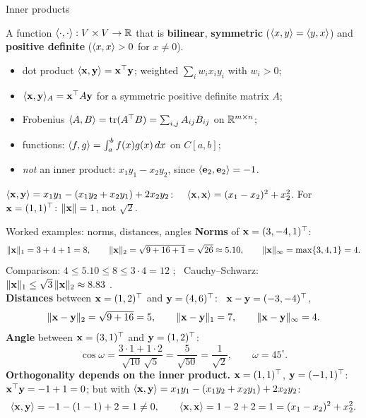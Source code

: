 \documentclass[aspectratio=1610,11pt]{beamer}
\begin{document}
\begin{frame}{Inner products}
    \begin{definition}
        A function $\langle \cdot, \cdot \rangle: V \times V \to \mathbb{R}$ that is
        \textbf{bilinear}, \textbf{symmetric} ($\langle x, y \rangle = \langle y, x \rangle$) and \textbf{positive definite} ($\langle x, x \rangle > 0$ for $x \neq 0$).
    \end{definition}
    \small
    \begin{itemize}
        \item dot product $\langle \mathbf{x}, \mathbf{y} \rangle = \mathbf{x}^\top\mathbf{y}$; \quad weighted $\sum_i w_i x_i y_i$ with $w_i > 0$;
        \item $\langle \mathbf{x}, \mathbf{y} \rangle_A = \mathbf{x}^\top A \mathbf{y}$ for a symmetric positive definite matrix $A$;
        \item Frobenius $\langle A, B \rangle = \operatorname{tr}(A^\top B) = \sum_{i,j} A_{ij}B_{ij}$ on $\mathbb{R}^{m \times n}$;
        \item functions: $\langle f, g \rangle = \int_a^b f(x)g(x)\,dx$ on $C[a, b]$;
        \item \emph{not} an inner product: $x_1y_1 - x_2y_2$, since $\langle \mathbf{e}_2, \mathbf{e}_2 \rangle = -1$.
    \end{itemize}
    \begin{example}[][ex:ip-A]
        \small $\langle \mathbf{x}, \mathbf{y} \rangle = x_1y_1 - (x_1y_2 + x_2y_1) + 2x_2y_2$: \ \ $\langle \mathbf{x}, \mathbf{x} \rangle = (x_1 - x_2)^2 + x_2^2$. For $\mathbf{x} = (1, 1)^\top$: $\lVert \mathbf{x} \rVert = 1$, not $\sqrt{2}$.
    \end{example}
\end{frame}

\begin{frame}{Worked examples: norms, distances, angles}
    \small
    \textbf{Norms} of $\mathbf{x} = (3, -4, 1)^\top$:
    \[\lVert \mathbf{x} \rVert_1 = 3 + 4 + 1 = 8, \qquad \lVert \mathbf{x} \rVert_2 = \sqrt{9 + 16 + 1} = \sqrt{26} \approx 5.10, \qquad \lVert \mathbf{x} \rVert_\infty = \max\{3, 4, 1\} = 4.\]
    Comparison: $4 \leq 5.10 \leq 8 \leq 3 \cdot 4 = 12$ \checkmark; \ Cauchy--Schwarz: $\lVert \mathbf{x} \rVert_1 \leq \sqrt{3}\,\lVert \mathbf{x} \rVert_2 \approx 8.83$ \checkmark.
    \\[0.4em]
    \textbf{Distances} between $\mathbf{x} = (1, 2)^\top$ and $\mathbf{y} = (4, 6)^\top$: \ $\mathbf{x} - \mathbf{y} = (-3, -4)^\top$,
    \[\lVert \mathbf{x} - \mathbf{y} \rVert_2 = \sqrt{9 + 16} = 5, \qquad \lVert \mathbf{x} - \mathbf{y} \rVert_1 = 7, \qquad \lVert \mathbf{x} - \mathbf{y} \rVert_\infty = 4.\]
    \textbf{Angle} between $\mathbf{x} = (3, 1)^\top$ and $\mathbf{y} = (1, 2)^\top$:
    \[\cos\omega = \frac{3 \cdot 1 + 1 \cdot 2}{\sqrt{10}\,\sqrt{5}} = \frac{5}{\sqrt{50}} = \frac{1}{\sqrt{2}}, \qquad \omega = 45^\circ.\]
    \textbf{Orthogonality depends on the inner product.} $\mathbf{x} = (1, 1)^\top$, $\mathbf{y} = (-1, 1)^\top$: $\mathbf{x}^\top\mathbf{y} = -1 + 1 = 0$; but with $\langle \mathbf{x}, \mathbf{y} \rangle = x_1y_1 - (x_1y_2 + x_2y_1) + 2x_2y_2$:
    \[\langle \mathbf{x}, \mathbf{y} \rangle = -1 - (1 - 1) + 2 = 1 \neq 0, \qquad \langle \mathbf{x}, \mathbf{x} \rangle = 1 - 2 + 2 = 1 = (x_1 - x_2)^2 + x_2^2.\]
\end{frame}
\end{document}
